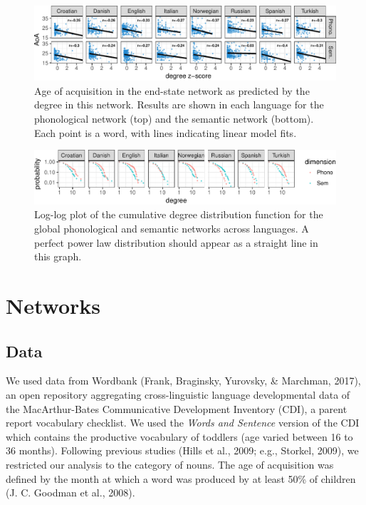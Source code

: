\documentclass[10pt, letterpaper]{article}
\newenvironment{CodeChunk}{}{}
\begin{document}
\begin{CodeChunk}
\begin{figure}[h]

{\centering \includegraphics{figs/all_data-1} 

}

\caption{\label{fig:data_all}Age of acquisition in the end-state network as predicted by the degree in this network. Results are shown in each language for the phonological network (top) and the semantic network (bottom). Each point is a word, with lines indicating linear model fits.}\label{fig:all_data}
\end{figure}
\end{CodeChunk}

\begin{CodeChunk}
\begin{figure}[h]

{\centering \includegraphics{figs/degree_distribution-1} 

}

\caption{\label{fig:degree_distribution}Log-log plot of the cumulative degree distribution function for the global phonological and semantic networks across languages. A perfect power law distribution should appear as a straight line in this graph.}\label{fig:degree_distribution}
\end{figure}
\end{CodeChunk}

\section{Networks}\label{networks}

\subsection{Data}\label{data}

We used data from Wordbank (Frank, Braginsky, Yurovsky, \& Marchman,
2017), an open repository aggregating cross-linguistic language
developmental data of the MacArthur-Bates Communicative Development
Inventory (CDI), a parent report vocabulary checklist. We used the
\emph{Words and Sentence} version of the CDI which contains the
productive vocabulary of toddlers (age varied between 16 to 36 months).
Following previous studies (Hills et al., 2009; e.g., Storkel, 2009), we
restricted our analysis to the category of nouns. The age of acquisition
was defined by the month at which a word was produced by at least 50\%
of children (J. C. Goodman et al., 2008).
\end{document}
